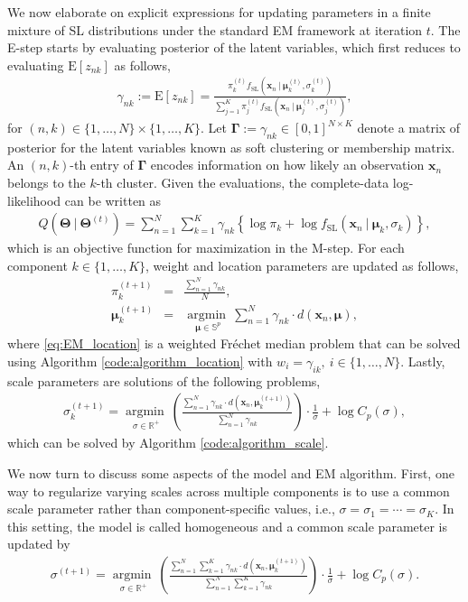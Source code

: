 \documentclass[10pt]{article}
\DeclareMathOperator*{\argmin}{argmin}
\newcommand{\bfx}{\mathbf{x}}
\newcommand{\bfmu}{\boldsymbol{\mu}}
\newcommand{\bfTheta}{\mathbf{\Theta}}
\newcommand{\bfGamma}{\mathbf{\Gamma}}
\newcommand{\bbS}{\mathbb{S}}
\newcommand{\bbRpos}{\mathbb{R}^+}
\newcommand{\rmE}{\textrm{E}}
\newcommand{\fSL}{f_{\textrm{SL}}}
\newcommand{\Frechet}{Fr\'{e}chet }
\begin{document}
We now elaborate on explicit expressions for updating parameters in a finite mixture of SL distributions under the standard EM framework at iteration $t$. The E-step starts by evaluating posterior of the latent variables, which first reduces to evaluating $\rmE[z_{nk}]$ as follows,
\begin{eqnarray}
\gamma_{nk} := \rmE[z_{nk}] = \frac{\pi_k^{(t)} \fSL(\bfx_n~|~\bfmu_k^{(t)}, \sigma_k^{(t)})}{\sum_{j=1}^K \pi_j^{(t)} \fSL(\bfx_n~|~\bfmu_j^{(t)}, \sigma_j^{(t)})},
\end{eqnarray}
for $(n,k) \in \lbrace 1,\ldots, N\rbrace \times \lbrace 1,\ldots, K\rbrace$. Let $\bfGamma := \gamma_{nk} \in [0,1]^{N\times K}$ denote a matrix of posterior for the latent variables known as soft clustering or membership matrix. An $(n,k)$-th entry of $\bfGamma$ encodes information on how likely an observation $\bfx_n$ belongs to the $k$-th cluster. Given the evaluations, the complete-data log-likelihood can be written as
\begin{eqnarray*}
	Q(\bfTheta~|~\bfTheta^{(t)}) = \sum_{n=1}^N \sum_{k=1}^K \gamma_{nk} \left\lbrace 
	\log \pi_k + \log \fSL (\bfx_n~|~\bfmu_k, \sigma_k)
	\right\rbrace,
\end{eqnarray*}
which is an objective function for maximization in the M-step. For each component $k\in\lbrace 1,\ldots,K\rbrace$,  weight and location parameters are updated as follows,
\begin{eqnarray}
\pi_k^{(t+1)} &=& \frac{\sum_{n=1}^N \gamma_{nk}}{N},\nonumber\\
\bfmu_k^{(t+1)} &=& \underset{\bfmu \in \bbS^p}{\argmin~} \sum_{n=1}^N \gamma_{nk} \cdot d(\bfx_n, \bfmu), \label{eq:EM_location}
\end{eqnarray}
where \eqref{eq:EM_location} is a weighted \Frechet median problem that can be solved using Algorithm \ref{code:algorithm_location} with $w_i = \gamma_{ik},~i\in\lbrace 1,\ldots, N\rbrace$. Lastly, scale parameters are solutions of the following problems,
\begin{eqnarray}\label{eq:EM_scale_hetero}
\sigma_k^{(t+1)} = \underset{\sigma \in \bbRpos}{\argmin~} \left(\frac{\sum_{n=1}^N \gamma_{nk} \cdot d(\bfx_n, \bfmu_k^{(t+1)})}{\sum_{n=1}^N \gamma_{nk}}\right) \cdot \frac{1}{\sigma} + \log C_p (\sigma),
\end{eqnarray}
which can be solved by Algorithm \ref{code:algorithm_scale}. 



We now turn to discuss some aspects of the model and EM algorithm. First, one way to regularize varying scales across multiple components is to use a common scale parameter rather than component-specific values, i.e., $\sigma = \sigma_1 = \cdots = \sigma_K$. In this setting, the model is called homogeneous and a common scale parameter is updated by
\begin{eqnarray}\label{eq:EM_scale_homo}
\sigma^{(t+1)} = \underset{\sigma \in \bbRpos}{\argmin~} \left(\frac{\sum_{n=1}^N \sum_{k=1}^K \gamma_{nk} \cdot d(\bfx_n, \bfmu_k^{(t+1)})}{\sum_{n=1}^N \sum_{k=1}^K \gamma_{nk}}\right) \cdot \frac{1}{\sigma} + \log C_p (\sigma).
\end{eqnarray}
\end{document}
